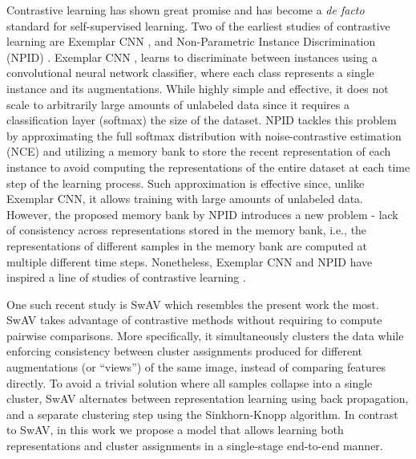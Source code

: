 \documentclass[runningheads]{llncs}
\begin{document}
Contrastive learning has shown great promise and has become a \emph{de facto} standard for self-supervised learning. Two of the earliest studies of contrastive learning are Exemplar CNN \cite{dosovitskiy2014discriminative}, and Non-Parametric Instance Discrimination (NPID) \cite{wu2018unsupervised}. Exemplar CNN \cite{dosovitskiy2014discriminative}, learns to discriminate between instances using a convolutional neural network classifier, where each class represents a single instance and its augmentations. While highly simple and effective, it does not scale to arbitrarily large amounts of unlabeled data since it requires a classification layer (softmax) the size of the dataset. NPID  \cite{wu2018unsupervised} tackles this problem by approximating the full softmax distribution with noise-contrastive estimation (NCE) \cite{gutmann2010noise} and utilizing a memory bank to store the recent representation of each instance to avoid computing the representations of the entire dataset at each time step of the learning process. Such approximation is effective since, unlike Exemplar CNN, it allows training with large amounts of unlabeled data. However, the proposed memory bank by NPID introduces a new problem - lack of consistency across representations stored in the memory bank, i.e., the representations of different samples in the memory bank are computed at multiple different time steps. Nonetheless, Exemplar CNN and NPID have inspired a line of studies of contrastive learning \cite{he2020momentum,chen2020improved,DBLP:journals/corr/abs-2002-05709,chen2020big,li2021prototypical,caron2020unsupervised}. 

One such recent study is SwAV \cite{caron2020unsupervised} which resembles the present work the most. SwAV takes advantage of contrastive methods without requiring to compute pairwise comparisons. More specifically, it simultaneously clusters the data while enforcing consistency between cluster assignments produced for different augmentations (or “views”) of the same image, instead of comparing features directly. To avoid a trivial solution where all samples collapse into a single cluster, SwAV alternates between representation learning using back propagation, and a separate clustering step using the Sinkhorn-Knopp algorithm. In contrast to SwAV, in this work we propose a model that allows learning both representations and cluster assignments in a single-stage end-to-end manner.  
\end{document}
